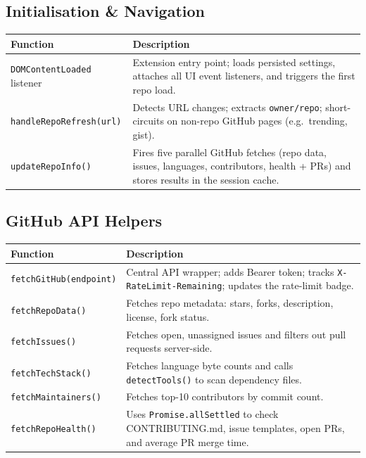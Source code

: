 \documentclass[11pt,a4paper]{article}
\begin{document}
\subsection{Initialisation \& Navigation}

\begin{longtable}{L{5.2cm} L{8.3cm}}
    \toprule
    \textbf{Function} & \textbf{Description} \\
    \midrule
    \endhead
    \bottomrule
    \endfoot

    \texttt{DOMContentLoaded} listener &
        Extension entry point; loads persisted settings, attaches all UI event listeners, and triggers the first repo load. \\
    \addlinespace

    \texttt{handleRepoRefresh(url)} &
        Detects URL changes; extracts \texttt{owner/repo}; short-circuits on non-repo GitHub pages (e.g.\ trending, gist). \\
    \addlinespace

    \texttt{updateRepoInfo()} &
        Fires five parallel GitHub fetches (repo data, issues, languages, contributors, health + PRs) and stores results in the session cache. \\
\end{longtable}

\subsection{GitHub API Helpers}

\begin{longtable}{L{5.2cm} L{8.3cm}}
    \toprule
    \textbf{Function} & \textbf{Description} \\
    \midrule
    \endhead
    \bottomrule
    \endfoot

    \texttt{fetchGitHub(endpoint)} &
        Central API wrapper; adds Bearer token; tracks \texttt{X-RateLimit-Remaining}; updates the rate-limit badge. \\
    \addlinespace

    \texttt{fetchRepoData()} &
        Fetches repo metadata: stars, forks, description, license, fork status. \\
    \addlinespace

    \texttt{fetchIssues()} &
        Fetches open, unassigned issues and filters out pull requests server-side. \\
    \addlinespace

    \texttt{fetchTechStack()} &
        Fetches language byte counts and calls \texttt{detectTools()} to scan dependency files. \\
    \addlinespace

    \texttt{fetchMaintainers()} &
        Fetches top-10 contributors by commit count. \\
    \addlinespace

    \texttt{fetchRepoHealth()} &
        Uses \texttt{Promise.allSettled} to check CONTRIBUTING.md, issue templates, open PRs, and average PR merge time. \\
\end{longtable}
\end{document}
